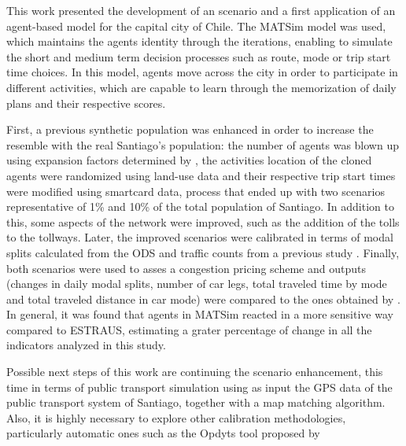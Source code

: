 \documentclass[Journal,letterpaper]{ascelike-new}
\begin{document}
This work presented the development of an scenario and a first application of an agent-based model for the capital city of Chile. The MATSim model was used, which maintains the agents identity through the iterations, enabling to simulate the short and medium term decision processes such as route, mode or trip start time choices. In this model, agents move across the city in order to participate in different activities, which are capable to learn through the memorization of daily plans and their respective scores. 

First, a previous synthetic population \citep{MATSimSantiago} was enhanced in order to increase the resemble with the real Santiago's population: the number of agents was blown up using expansion factors determined by \cite{Contreras2015}, the activities location of the cloned agents were randomized using land-use data and their respective trip start times were modified using smartcard data, process that ended up with two scenarios representative of 1\% and 10\% of the total population of Santiago. In addition to this, some aspects of the network were improved, such as the addition of the tolls to the tollways. Later, the improved scenarios were calibrated in terms of modal splits calculated from the ODS and traffic counts from a previous study \citep{AFOROS2013}. Finally, both scenarios were used to asses a congestion pricing scheme and outputs (changes in daily modal splits, number of car legs, total traveled time by mode and total traveled distance in car mode) were compared to the ones obtained by \cite{gleave2009tarificacion}. In general, it was found that agents in MATSim reacted in a more sensitive way compared to ESTRAUS,  estimating a grater percentage of change in all the indicators analyzed in this study. 

Possible next steps of this work are continuing the scenario enhancement, this time in terms of public transport simulation using as input the GPS data of the public transport system of Santiago, together with a map matching algorithm. Also, it is highly necessary to explore other calibration methodologies, particularly automatic ones such as the Opdyts tool proposed by \cite{flotterod2017search}


\appendix
%
%

%

\end{document}
